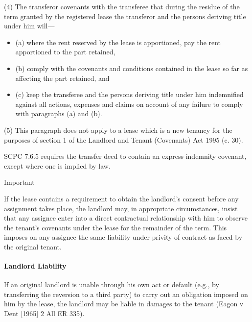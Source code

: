 \documentclass[
]{article}
\providecommand{\tightlist}{%
  \setlength{\itemsep}{0pt}\setlength{\parskip}{0pt}}
\newenvironment{env-2aad614f-6fd6-4025-876c-fcdbeae766fb}
{
    \savenotes\tcolorbox[blanker,breakable,left=5pt,borderline west={2pt}{-4pt}{green}]
}
{
    \endtcolorbox\spewnotes
}
\newenvironment{env-4361be9f-9a08-465c-86d1-6b024e2d00e2}
{
    \savenotes\tcolorbox[blanker,breakable,left=5pt,borderline west={2pt}{-4pt}{cyan}]
}
{
    \endtcolorbox\spewnotes
}
\begin{document}
\begin{env-2aad614f-6fd6-4025-876c-fcdbeae766fb}
(4) The transferor covenants with the transferee that during the residue
of the term granted by the registered lease the transferor and the
persons deriving title under him will---

\begin{itemize}
\tightlist
\item
  (a) where the rent reserved by the lease is apportioned, pay the rent
  apportioned to the part retained,
\item
  (b) comply with the covenants and conditions contained in the lease so
  far as affecting the part retained, and
\item
  (c) keep the transferee and the persons deriving title under him
  indemnified against all actions, expenses and claims on account of any
  failure to comply with paragraphs (a) and (b).
\end{itemize}

(5) This paragraph does not apply to a lease which is a new tenancy for
the purposes of section 1 of the Landlord and Tenant (Covenants) Act
1995 (c. 30).

\end{env-2aad614f-6fd6-4025-876c-fcdbeae766fb}

SCPC 7.6.5 requires the transfer deed to contain an express indemnity
covenant, except where one is implied by law.

\begin{env-4361be9f-9a08-465c-86d1-6b024e2d00e2}

Important

If the lease contains a requirement to obtain the landlord's consent
before any assignment takes place, the landlord may, in appropriate
circumstances, insist that any assignee enter into a direct contractual
relationship with him to observe the tenant's covenants under the lease
for the remainder of the term. This imposes on any assignee the same
liability under privity of contract as faced by the original tenant.

\end{env-4361be9f-9a08-465c-86d1-6b024e2d00e2}

\hypertarget{landlord-liability}{%
\paragraph{Landlord Liability}\label{landlord-liability}}

If an original landlord is unable through his own act or default (e.g.,
by transferring the reversion to a third party) to carry out an
obligation imposed on him by the lease, the landlord may be liable in
damages to the tenant (Eagon v Dent {[}1965{]} 2 All ER 335).
\end{document}
